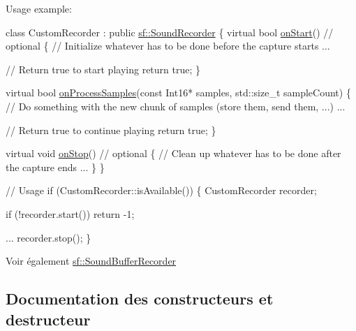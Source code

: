 Usage example\+: 
\begin{DoxyCode}
\textcolor{keyword}{class }CustomRecorder : \textcolor{keyword}{public} \hyperlink{classsf_1_1SoundRecorder}{sf::SoundRecorder}
\{
    \textcolor{keyword}{virtual} \textcolor{keywordtype}{bool} \hyperlink{classsf_1_1SoundRecorder_a7af418fb036201d3f85745bef78ce77f}{onStart}() \textcolor{comment}{// optional}
    \{
        \textcolor{comment}{// Initialize whatever has to be done before the capture starts}
        ...

        \textcolor{comment}{// Return true to start playing}
        \textcolor{keywordflow}{return} \textcolor{keyword}{true};
    \}

    \textcolor{keyword}{virtual} \textcolor{keywordtype}{bool} \hyperlink{classsf_1_1SoundRecorder_a2670124cbe7a87c7e46b4840807f4fd7}{onProcessSamples}(\textcolor{keyword}{const} Int16* samples, std::size\_t sampleCount)
    \{
        \textcolor{comment}{// Do something with the new chunk of samples (store them, send them, ...)}
        ...

        \textcolor{comment}{// Return true to continue playing}
        \textcolor{keywordflow}{return} \textcolor{keyword}{true};
    \}

    \textcolor{keyword}{virtual} \textcolor{keywordtype}{void} \hyperlink{classsf_1_1SoundRecorder_aefc36138ca1e96c658301280e4a31b64}{onStop}() \textcolor{comment}{// optional}
    \{
        \textcolor{comment}{// Clean up whatever has to be done after the capture ends}
        ...
    \}
\}

\textcolor{comment}{// Usage}
\textcolor{keywordflow}{if} (CustomRecorder::isAvailable())
\{
    CustomRecorder recorder;

    \textcolor{keywordflow}{if} (!recorder.start())
        \textcolor{keywordflow}{return} -1;

    ...
    recorder.stop();
\}
\end{DoxyCode}


\begin{DoxySeeAlso}{Voir également}
\hyperlink{classsf_1_1SoundBufferRecorder}{sf\+::\+Sound\+Buffer\+Recorder} 
\end{DoxySeeAlso}


\subsection{Documentation des constructeurs et destructeur}
\mbox{\label{classsf_1_1SoundRecorder_a50ebad413c4f157408a0fa49f23212a9}} 
